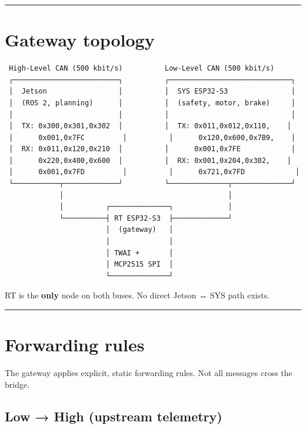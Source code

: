 \documentclass[12pt,a4paper,oneside]{report}
\begin{document}
\begin{center}\rule{0.5\linewidth}{0.5pt}\end{center}

\section{Gateway topology}\label{gateway-topology}

\begin{verbatim}
 High-Level CAN (500 kbit/s)          Low-Level CAN (500 kbit/s)
 ┌─────────────────────────┐          ┌─────────────────────────────┐
 │  Jetson                 │          │  SYS ESP32-S3               │
 │  (ROS 2, planning)      │          │  (safety, motor, brake)     │
 │                         │          │                             │
 │  TX: 0x300,0x301,0x302  │          │  TX: 0x011,0x012,0x110,    │
 │      0x001,0x7FC         │          │      0x120,0x600,0x7B9,    │
 │  RX: 0x011,0x120,0x210  │          │      0x001,0x7FE            │
 │      0x220,0x400,0x600  │          │  RX: 0x001,0x204,0x302,    │
 │      0x001,0x7FD         │          │      0x721,0x7FD            │
 └───────────┬─────────────┘          └──────────────┬──────────────┘
             │                                       │
             │          ┌──────────────┐             │
             └──────────┤ RT ESP32-S3  ├─────────────┘
                        │  (gateway)   │
                        │              │
                        │ TWAI +       │
                        │ MCP2515 SPI  │
                        └──────────────┘
\end{verbatim}

RT is the \textbf{only} node on both buses. No direct Jetson ↔ SYS path exists.

\begin{center}\rule{0.5\linewidth}{0.5pt}\end{center}

\section{Forwarding rules}\label{forwarding-rules}

The gateway applies explicit, static forwarding rules. Not all messages cross
the bridge.

\subsection{Low → High (upstream telemetry)}\label{low-high-upstream-telemetry}
\end{document}

